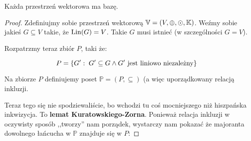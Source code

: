 \begin{theorem}
	Każda przestrzeń wektorowa ma bazę.
\end{theorem}
\begin{proof}
	Zdefiniujmy sobie przestrzeń wektorową \( \mathbb{V} = (V, \oplus, \odot, \mathbb{K})\). Weźmy sobie jakieś \( G \subseteq V \) takie, że \({\mathrm{Lin}}(G) = V\). Takie \(G\) musi istnieć (w szczególności \(G = V\)).

	Rozpatrzmy teraz zbiór \(P\), taki że:

	\[
		P = \set{G': \; G' \subseteq G \land \text{\(G'\) jest liniowo niezależny}}
	\]

	Na zbiorze \(P\) definiujemy poset \( \mathbb{P} = (P, \subseteq)\) (a więc uporządkowany relacją inkluzji.

	Teraz tego się nie spodziewaliście, bo wchodzi tu coś mocniejszego niż hiszpańska inkwizycja. To \textbf{lemat Kuratowskiego-Zorna}. Ponieważ relacja inkluzji w oczywisty sposób ,,tworzy'' nam porządek, wystarczy nam pokazać że majoranta dowolnego łańcucha w \(\mathbb{P}\) znajduje się w \(P\):


\end{proof}
